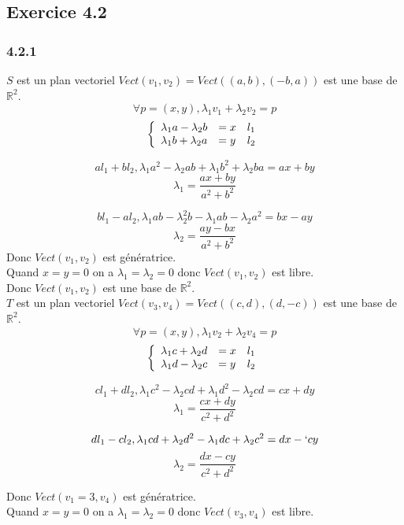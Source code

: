 \documentclass[]{book}
\theoremstyle{definition}
\newcommand{\bb}[1]{\mathbb{#1}}
\newcommand{\R}{\bb{R}}
\begin{document}
\subsection*{Exercice 4.2}
\subsubsection*{4.2.1}
$S$ est un plan vectoriel $Vect(v_1,v_2) = Vect((a,b),(-b,a))$ est une base de $\R^2$.\\
$$\forall p=(x,y), \lambda_1 v_1 + \lambda_2 v_2 = p$$
$$
\left\{ 
\begin{array}{l l l}
\lambda_1 a - \lambda_2 b & = x & l_1\\
\lambda_1 b + \lambda_2 a & = y & l_2\\
\end{array}
\right. 
$$

$$a l_1 + b l_2, \lambda_1 a^2-\lambda_2 ab + \lambda_1 b^2 + \lambda_2 ba = ax+by$$
$$\lambda_1 = \frac{ax+by}{a^2+b^2}$$ 

$$b l_1 - a l_2, \lambda_1 ab -\lambda_2 ^2b - \lambda_1 ab - \lambda_2 a^2 = bx-ay$$
$$\lambda_2 = \frac{ay-bx}{a^2+b^2}$$ 
Donc $Vect(v_1,v_2)$ est g\'en\'eratrice.\\

Quand $x=y=0$ on a $\lambda_1 = \lambda_2 = 0$ donc $Vect(v_1,v_2)$ est libre.\\

Donc $Vect(v_1,v_2)$ est une base de $\R^2$.\\

$T$ est un plan vectoriel $Vect(v_3,v_4) = Vect((c,d),(d,-c))$ est une base de $\R^2$.\\
$$\forall p=(x,y), \lambda_1 v_2 + \lambda_2 v_4 = p$$
$$
\left\{ 
\begin{array}{l l l}
\lambda_1 c + \lambda_2 d & = x & l_1\\
\lambda_1 d - \lambda_2 c & = y & l_2\\
\end{array}
\right. 
$$

$$c l_1 + d l_2, \lambda_1 c^2 -\lambda_2 cd + \lambda_1 d^2 - \lambda_2 cd = cx+dy$$
$$\lambda_1 = \frac{cx+dy}{c^2+d^2}$$ 

$$d l_1 - c l_2, \lambda_1 cd + \lambda_2 d^2 - \lambda_1 dc + \lambda_2 c^2 = dx-`cy$$
$$\lambda_2 = \frac{dx-cy}{c^2+d^2}$$ 

Donc $Vect(v_1=3,v_4)$ est g\'en\'eratrice.\\

Quand $x=y=0$ on a $\lambda_1 = \lambda_2 = 0$ donc $Vect(v_3,v_4)$ est libre.\\
\end{document}
